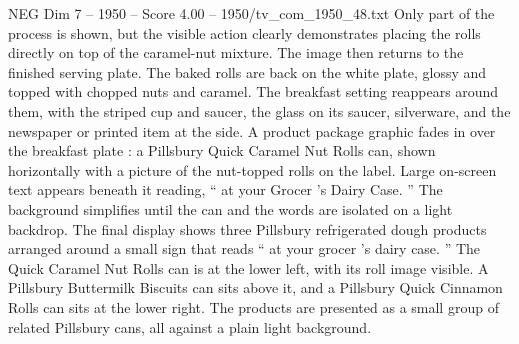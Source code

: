 \begin{textsample}{NEG Dim 7 – 1950 – Score 4.00 – 1950/tv\_com\_1950\_48.txt}
Only part of the process is shown, but the visible action clearly demonstrates placing the rolls directly on top of the caramel-nut mixture.
The image then returns to the finished serving plate.
The baked rolls are back on the white plate, glossy and topped with chopped nuts and caramel.
The breakfast setting reappears around them, with the striped cup and saucer, the glass on its saucer, silverware, and the newspaper or printed item at the side.
A product package graphic fades in over the breakfast plate : a Pillsbury Quick Caramel Nut Rolls can, shown horizontally with a picture of the nut-topped rolls on the label.
Large on-screen text appears beneath it reading, “ at your Grocer ’s Dairy Case. ” The background simplifies until the can and the words are isolated on a light backdrop.
The final display shows three Pillsbury refrigerated dough products arranged around a small sign that reads “ at your grocer ’s dairy case. ” The Quick Caramel Nut Rolls can is at the lower left, with its roll image visible.
A Pillsbury Buttermilk Biscuits can sits above it, and a Pillsbury Quick Cinnamon Rolls can sits at the lower right.
The products are presented as a small group of related Pillsbury cans, all against a plain light background.

\end{textsample}
